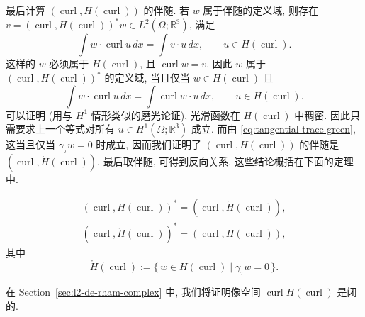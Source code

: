 {最后计算 $(\operatorname{curl},H(\operatorname{curl}))$ 的伴随. 若 $w$ 属于伴随的定义域, \newline 则存在 $v=(\operatorname{curl},H(\operatorname{curl}))^*w\in L^2(\Omega;\mathbb R^3)$, 满足}
\[
\int w\cdot\operatorname{curl}u\,dx=\int v\cdot u\,dx,\qquad u\in H(\operatorname{curl}).
\]
{这样的 $w$ 必须属于 $H(\operatorname{curl})$, 且 $\operatorname{curl}w=v$. 因此 $w$ 属于 $(\operatorname{curl},H(\operatorname{curl}))^*$ 的定义域, 当且仅当 $w\in H(\operatorname{curl})$ 且}
\[
\int w\cdot\operatorname{curl}u\,dx=\int\operatorname{curl}w\cdot u\,dx,\qquad u\in H(\operatorname{curl}).
\]
{可以证明 (用与 $H^1$ 情形类似的磨光论证), 光滑函数在 $H(\operatorname{curl})$ 中稠密. 因此只需要求上一个等式对所有 $u\in H^1(\Omega;\mathbb R^3)$ 成立. 而由 \eqref{eq:tangential-trace-green}, 这当且仅当 $\gamma_\tau w=0$ 时成立, 因而我们证明了 $(\operatorname{curl},H(\operatorname{curl}))$ 的伴随是 $(\operatorname{curl},\mathring H(\operatorname{curl}))$. 最后取伴随, 可得到反向关系. 这些结论概括在下面的定理中.}


\begin{Theorem}\label{thm:curl-adjoints}
\[
\begin{gathered}
(\operatorname{curl},H(\operatorname{curl}))^*=(\operatorname{curl},\mathring H(\operatorname{curl})),\\
(\operatorname{curl},\mathring H(\operatorname{curl}))^*=(\operatorname{curl},H(\operatorname{curl})),
\end{gathered}
\]
{其中}
\[
\mathring H(\operatorname{curl}):=\{\,w\in H(\operatorname{curl})\mid\gamma_\tau w=0\,\}.
\]
\end{Theorem}

{在 Section~\ref{sec:l2-de-rham-complex} 中, 我们将证明像空间 $\operatorname{curl}H(\operatorname{curl})$ 是闭的.}

